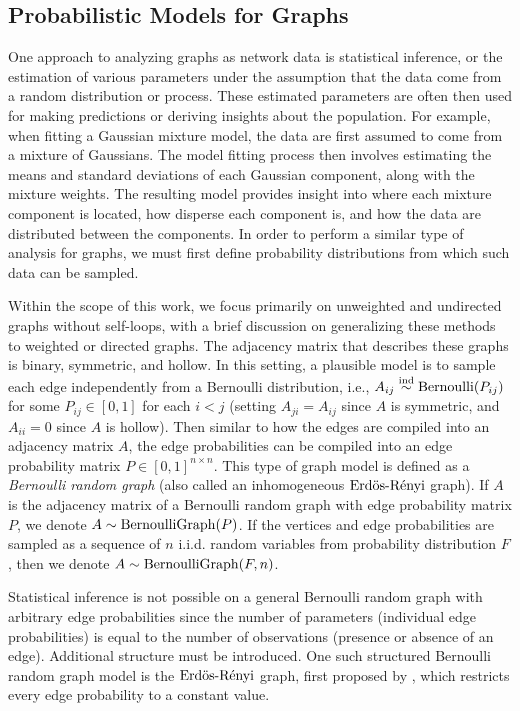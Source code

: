 \documentclass[
  12pt,
]{article}
\theoremstyle{definition}
\theoremstyle{definition}
\theoremstyle{definition}
\theoremstyle{definition}
\theoremstyle{remark}
\begin{document}
\hypertarget{probabilistic-models-for-graphs}{%
\subsection{Probabilistic Models for Graphs}\label{probabilistic-models-for-graphs}}

One approach to analyzing graphs as network data is statistical inference, or the estimation of various parameters under the assumption that the data come from a random distribution or process.
These estimated parameters are often then used for making predictions or deriving insights about the population.
For example, when fitting a Gaussian mixture model, the data are first assumed to come from a mixture of Gaussians.
The model fitting process then involves estimating the means and standard deviations of each Gaussian component, along with the mixture weights.
The resulting model provides insight into where each mixture component is located, how disperse each component is, and how the data are distributed between the components.
In order to perform a similar type of analysis for graphs, we must first define probability distributions from which such data can be sampled.

Within the scope of this work, we focus primarily on unweighted and undirected graphs without self-loops, with a brief discussion on generalizing these methods to weighted or directed graphs.
The adjacency matrix that describes these graphs is binary, symmetric, and hollow.
In this setting, a plausible model is to sample each edge independently from a Bernoulli distribution, i.e., \(A_{ij} \stackrel{\mathrm{ind}}{\sim} \mathrm{Bernoulli}(P_{ij})\) for some \(P_{ij} \in [0, 1]\) for each \(i < j\) (setting \(A_{ji} = A_{ij}\) since \(A\) is symmetric, and \(A_{ii} = 0\) since \(A\) is hollow).
Then similar to how the edges are compiled into an adjacency matrix \(A\), the edge probabilities can be compiled into an edge probability matrix \(P \in [0, 1]^{n \times n}\).
This type of graph model is defined as a \emph{Bernoulli random graph} (also called an inhomogeneous \(\text{Erd\"{o}s-R\'{e}nyi}\) graph).
If \(A\) is the adjacency matrix of a Bernoulli random graph with edge probability matrix \(P\), we denote \(A \sim \mathrm{BernoulliGraph}(P)\).
If the vertices and edge probabilities are sampled as a sequence of \(n\) i.i.d. random variables from probability distribution \(F\), then we denote \(A \sim \mathrm{BernoulliGraph}(F, n)\).

Statistical inference is not possible on a general Bernoulli random graph with arbitrary edge probabilities since the number of parameters (individual edge probabilities) is equal to the number of observations (presence or absence of an edge).
Additional structure must be introduced.
One such structured Bernoulli random graph model is the \(\text{Erd\"{o}s-R\'{e}nyi}\) graph, first proposed by \cite{Gilbert:1959}, which restricts every edge probability to a constant value.
\end{document}
